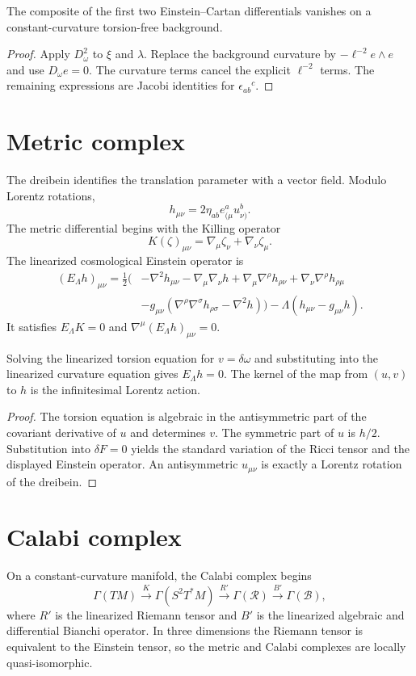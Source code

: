 \begin{proposition}
The composite of the first two Einstein--Cartan differentials vanishes on a constant-curvature torsion-free background.
\end{proposition}
\begin{proof}
Apply $D_\omega^2$ to $\xi$ and $\lambda$.  Replace the background curvature by $-\ell^{-2}e\wedge e$ and use $D_\omega e=0$.  The curvature terms cancel the explicit $\ell^{-2}$ terms.  The remaining expressions are Jacobi identities for $\epsilon_{ab}{}^c$.
\end{proof}

\section{Metric complex}
The dreibein identifies the translation parameter with a vector field.  Modulo Lorentz rotations,
\[
 h_{\mu\nu}=2\eta_{ab}e^a_{(\mu}u^b_{\nu)}.
\]
The metric differential begins with the Killing operator
\[
 K(\zeta)_{\mu\nu}=\nabla_\mu\zeta_\nu+\nabla_\nu\zeta_\mu.
\]
The linearized cosmological Einstein operator is
\[
 \begin{aligned}
 (E_\Lambda h)_{\mu\nu}
 =\frac12\bigl(&-\nabla^2h_{\mu\nu}-\nabla_\mu\nabla_\nu h
 +\nabla_\mu\nabla^\rho h_{\rho\nu}
 +\nabla_\nu\nabla^\rho h_{\rho\mu}\\
 &-g_{\mu\nu}(\nabla^\rho\nabla^\sigma h_{\rho\sigma}-\nabla^2h)
 \bigr)-\Lambda(h_{\mu\nu}-g_{\mu\nu}h).
 \end{aligned}
\]
It satisfies $E_\Lambda K=0$ and $\nabla^\mu(E_\Lambda h)_{\mu\nu}=0$.

\begin{theorem}
Solving the linearized torsion equation for $v=\delta\omega$ and substituting into the linearized curvature equation gives $E_\Lambda h=0$.  The kernel of the map from $(u,v)$ to $h$ is the infinitesimal Lorentz action.
\end{theorem}
\begin{proof}
The torsion equation is algebraic in the antisymmetric part of the covariant derivative of $u$ and determines $v$.  The symmetric part of $u$ is $h/2$.  Substitution into $\delta F=0$ yields the standard variation of the Ricci tensor and the displayed Einstein operator.  An antisymmetric $u_{\mu\nu}$ is exactly a Lorentz rotation of the dreibein.
\end{proof}

\section{Calabi complex}
On a constant-curvature manifold, the Calabi complex begins
\[
 \Gamma(TM)
 \xrightarrow{K}
 \Gamma(S^2T^*M)
 \xrightarrow{R'}
 \Gamma(\mathcal R)
 \xrightarrow{B'}
 \Gamma(\mathcal B),
\]
where $R'$ is the linearized Riemann tensor and $B'$ is the linearized algebraic and differential Bianchi operator.  In three dimensions the Riemann tensor is equivalent to the Einstein tensor, so the metric and Calabi complexes are locally quasi-isomorphic.


